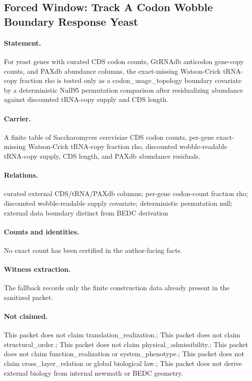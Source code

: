 \subsection{Forced Window: Track A Codon Wobble Boundary Response Yeast}
\label{sec:track-a-codon-wobble-boundary-response-yeast}

\paragraph{Statement.} For yeast genes with curated CDS codon counts, GtRNAdb anticodon gene-copy counts, and PAXdb abundance columns, the exact-missing Watson-Crick tRNA-copy fraction rho is tested only as a codon\_usage\_topology boundary covariate by a deterministic Null95 permutation comparison after residualizing abundance against discounted tRNA-copy supply and CDS length.

\paragraph{Carrier.} A finite table of Saccharomyces cerevisiae CDS codon counts, per-gene exact-missing Watson-Crick tRNA-copy fraction rho, discounted wobble-readable tRNA-copy supply, CDS length, and PAXdb abundance residuals.

\paragraph{Relations.} curated external CDS/tRNA/PAXdb columns; per-gene codon-count fraction rho; discounted wobble-readable supply covariate; deterministic permutation null; external data boundary distinct from BEDC derivation

\paragraph{Counts and identities.} No exact count has been certified in the author-facing facts.

\paragraph{Witness extraction.} The fallback records only the finite construction data already present in the sanitized packet.

\paragraph{Not claimed.} This packet does not claim translation\_realization.; This packet does not claim structural\_order.; This packet does not claim physical\_admissibility.; This packet does not claim function\_realization or system\_phenotype.; This packet does not claim cross\_layer\_relation or global biological law.; This packet does not derive external biology from internal newmath or BEDC geometry.
